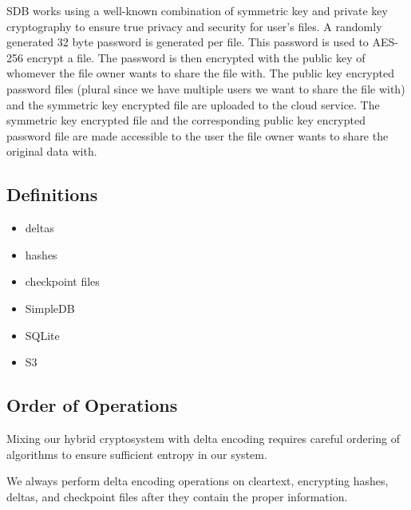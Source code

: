 SDB works using a well-known combination of symmetric key and private
key cryptography to ensure true privacy and security for user’s
files. A randomly generated 32 byte password is generated per
file. This password is used to AES-256 encrypt a file. The password is
then encrypted with the public key of whomever the file owner wants to
share the file with. The public key encrypted password files (plural
since we have multiple users we want to share the file with) and the
symmetric key encrypted file are uploaded to the cloud service. The
symmetric key encrypted file and the corresponding public key
encrypted password file are made accessible to the user the file owner
wants to share the original data with.

\subsection{Definitions}

\begin{itemize}
\item deltas
\item hashes
\item checkpoint files
\item SimpleDB
\item SQLite
\item S3
\end{itemize}

\subsection{Order of Operations}

Mixing our hybrid cryptosystem with delta encoding requires careful
ordering of algorithms to ensure sufficient entropy in our system.

We always perform delta encoding operations on cleartext, encrypting
hashes, deltas, and checkpoint files after they contain the proper
information.



